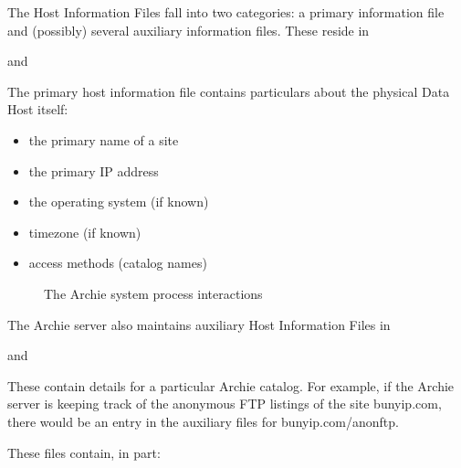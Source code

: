The Host Information Files fall into two categories: a primary information
file and (possibly) several auxiliary information files. These reside in



and



The primary host information file contains particulars about the physical Data
Host itself:


\begin{itemize}
\item the primary name of a site

\item the primary IP address

\item the operating system (if known)

\item timezone (if known)

\item access methods (catalog names)

\end{itemize}


\begin{figure}[!htb]
\begin{center}
\end{center}
\caption{The Archie system process interactions}
\label{fig:process}
\end{figure}


The Archie server also maintains auxiliary Host Information Files in



and



These contain details for a particular Archie catalog. For example, if the
Archie server is keeping track of the anonymous FTP listings of the site
bunyip.com, there would be an entry in the auxiliary files for
bunyip.com/anonftp.

These files contain, in part:

